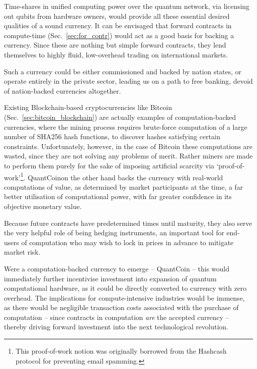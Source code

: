 Time-shares in unified computing power over the quantum network, via licensing out qubits from hardware owners, would provide all these essential desired qualities of a sound currency. It can be envisaged that forward contracts in compute-time (Sec.~\ref{sec:for_contr}) would act as a good basis for backing a currency. Since these are nothing but simple forward contracts, they lend themselves to highly fluid, low-overhead trading on international markets.

Such a currency could be either commissioned and backed by nation states, or operate entirely in the private sector, leading us on a path to free banking, devoid of nation-backed currencies altogether.

Existing Blockchain-based cryptocurrencies like Bitcoin (Sec.~\ref{sec:bitcoin_blockchain}) are actually examples of computation-backed currencies, where the mining process requires brute-force computation of a large number of SHA256 hash functions, to discover hashes satisfying certain constraints. Unfortunately, however, in the case of Bitcoin these computations are wasted, since they are not solving any problems of merit. Rather miners are made to perform them purely for the sake of imposing artificial scarcity via `proof-of-work'\footnote{This proof-of-work notion was originally borrowed from the Hashcash protocol for preventing email spamming.}. QuantCoin\texttrademark on the other hand backs the currency with real-world computations of value, as determined by market participants at the time, a far better utilisation of computational power, with far greater confidence in its objective monetary value.

Because future contracts have predetermined times until maturity, they also serve the very helpful role of being hedging instruments, an important tool for end-users of computation who may wish to lock in prices in advance to mitigate market risk.

Were a computation-backed currency to emerge -- QuantCoin\texttrademark{} -- this would immediately further incentivise investment into expansion of quantum computational hardware, as it could be directly converted to currency with zero overhead. The implications for compute-intensive industries would be immense, as there would be negligible transaction costs associated with the purchase of computation -- since contracts in computation \textit{are} the accepted currency -- thereby driving forward investment into the next technological revolution.


